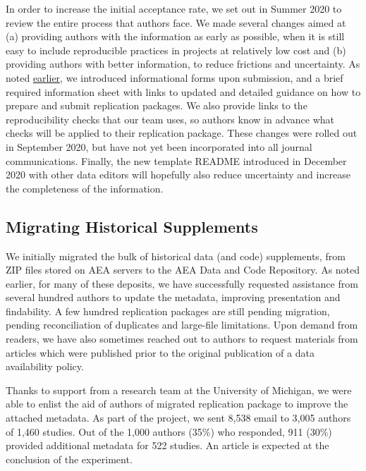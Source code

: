 \documentclass[PP]{AEA}
\newcommand{\aeadcr}{AEA Data and Code Repository}
\begin{document}
In order to increase the initial acceptance rate, we set out in Summer 2020 to review the entire process that authors face. We made several changes aimed at (a) providing authors with the information as early as possible, when it is still easy to include reproducible practices in projects at relatively low cost and (b) providing authors with better information, to reduce frictions and uncertainty. As noted  \hyperref[sec:dcap]{earlier}, we introduced informational forms upon submission, and a brief required information sheet with links to updated and detailed guidance on how to prepare and submit replication packages. We also provide links to the reproducibility checks that our team uses, so authors know in advance what checks will be applied to their replication package. These changes were rolled out in September 2020, but have not yet been incorporated into all journal communications. Finally, the new template README \citep{READMEv1.0.0} introduced in December 2020 with other data editors will hopefully also reduce uncertainty and increase the completeness of the information. 


\subsection{Migrating Historical Supplements}
\label{sec:migration}

We initially migrated the bulk of historical data (and code) supplements, from ZIP files stored on AEA servers to the \aeadcr{}. As noted earlier, for many of these deposits, we have successfully requested assistance from several hundred authors to update the metadata, improving presentation and findability. A few hundred replication packages are still pending migration, pending reconciliation of duplicates and large-file limitations. Upon demand from readers, we have also sometimes reached out to authors to request materials from articles which were published prior to the original publication of a data availability policy. 


Thanks to support from a research team at the University of Michigan, we were able to enlist the aid of authors of migrated replication package to improve the attached metadata.  As part of the project, we sent 8,538 email to 3,005 authors of 1,460 studies. Out of the 1,000 authors (35\%) who responded, 911 (30\%) provided additional metadata for 522 studies. An article is expected at the conclusion of the experiment.
\end{document}
